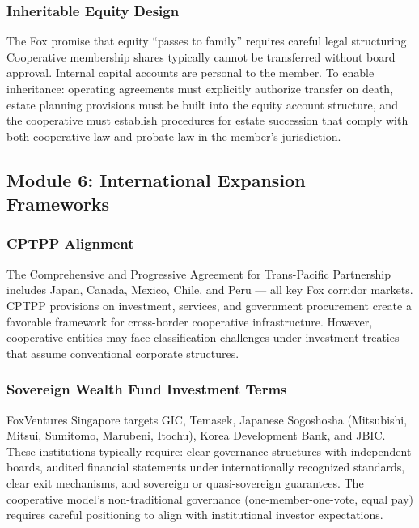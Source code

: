 \documentclass[11pt,letterpaper]{article}
\begin{document}
\subsubsection{Inheritable Equity Design}

The Fox promise that equity ``passes to family'' requires careful legal structuring. Cooperative membership shares typically cannot be transferred without board approval. Internal capital accounts are personal to the member. To enable inheritance: operating agreements must explicitly authorize transfer on death, estate planning provisions must be built into the equity account structure, and the cooperative must establish procedures for estate succession that comply with both cooperative law and probate law in the member's jurisdiction.

\subsection{Module 6: International Expansion Frameworks}

\subsubsection{CPTPP Alignment}

The Comprehensive and Progressive Agreement for Trans-Pacific Partnership includes Japan, Canada, Mexico, Chile, and Peru --- all key Fox corridor markets. CPTPP provisions on investment, services, and government procurement create a favorable framework for cross-border cooperative infrastructure. However, cooperative entities may face classification challenges under investment treaties that assume conventional corporate structures.

\subsubsection{Sovereign Wealth Fund Investment Terms}

FoxVentures Singapore targets GIC, Temasek, Japanese Sogoshosha (Mitsubishi, Mitsui, Sumitomo, Marubeni, Itochu), Korea Development Bank, and JBIC. These institutions typically require: clear governance structures with independent boards, audited financial statements under internationally recognized standards, clear exit mechanisms, and sovereign or quasi-sovereign guarantees. The cooperative model's non-traditional governance (one-member-one-vote, equal pay) requires careful positioning to align with institutional investor expectations.
\end{document}
